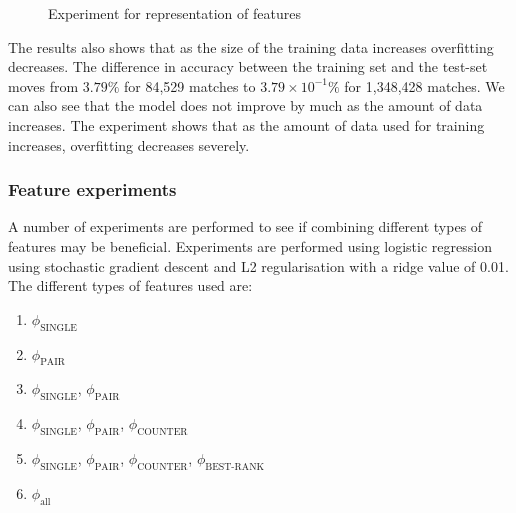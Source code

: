 \begin{figure}[!htb]
  \centering
{}
  \caption{Experiment for representation of features}\label{fig:clusterbigdata}
\end{figure}

The results also shows that as the size of the training data increases overfitting decreases. The difference in accuracy between the training set and the test-set moves from $3.79\%$ for 84,529 matches to $3.79\times10^{-1} \%$ for 1,348,428 matches. We can also see that the model does not improve by much as the amount of data increases. The experiment shows that as the amount of data used for training increases, overfitting decreases severely. 



\subsubsection{Feature experiments}\label{sec:feattest}
A number of experiments are performed to see if combining different types of features may be beneficial.
Experiments are performed using logistic regression using stochastic gradient descent and L2 regularisation with a ridge value of 0.01. The different types of features used are:
\begin{enumerate}
\item $\phi_\text{SINGLE}$
\item $\phi_\text{PAIR}$
\item $\phi_\text{SINGLE}$, $\phi_\text{PAIR}$
\item $\phi_\text{SINGLE}$, $\phi_\text{PAIR}$, $\phi_\text{COUNTER}$
\item $\phi_\text{SINGLE}$, $\phi_\text{PAIR}$, $\phi_\text{COUNTER}$, $\phi_\text{BEST-RANK}$
\item $\phi_\text{all}$
\end{enumerate}

